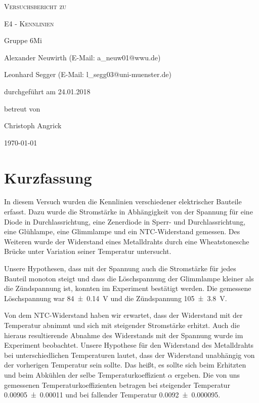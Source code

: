 \documentclass[
	a4paper,
	12pt,
	pagesize,
	ngerman
]{scrartcl}
\begin{document}
	
	\begin{titlepage}
		\centering
		{\scshape\LARGE Versuchsbericht zu \par}
		\vspace{1cm}
		{\scshape\huge E4 - Kennlinien \par} %
		\vspace{2.5cm}
		{\LARGE Gruppe 6Mi \par}
		\vspace{0.5cm}
		
		{\large Alexander Neuwirth (E-Mail: a\_neuw01@wwu.de) \par}
		{\large Leonhard Segger (E-Mail: l\_segg03@uni-muenster.de) \par}
		\vfill
		
		durchgeführt am 24.01.2018\par %
		betreut von\par
		{\large Christoph Angrick} %
		
		\vfill
		
		{\large \today\par}
	\end{titlepage}
	\tableofcontents
	\newpage


	\section{Kurzfassung}
	In diesem Versuch wurden die Kennlinien verschiedener elektrischer Bauteile erfasst.
	Dazu wurde die Stromstärke in Abhängigkeit von der Spannung für eine Diode in Durchlassrichtung, eine Zenerdiode in Sperr- und Durchlassrichtung, eine Glühlampe, eine Glimmlampe und ein NTC-Widerstand gemessen. 
	Des Weiteren wurde der Widerstand eines Metalldrahts durch eine Wheatstonesche Brücke unter Variation seiner Temperatur untersucht.

	Unsere Hypothesen, dass mit der Spannung auch die Stromstärke für jedes Bauteil monoton steigt und dass die Löschspannung der Glimmlampe kleiner als die Zündspannung ist, konnten im Experiment bestätigt werden.
	Die gemessene Löschspannung war \SI{84\pm 0,14}{V} und die Zündspannung \SI{105\pm3,8}{V}.

	Von dem NTC-Widerstand haben wir erwartet, dass der Widerstand mit der Temperatur abnimmt und sich mit steigender Stromstärke erhitzt. 
	Auch die hieraus resultierende Abnahme des Widerstands mit der Spannung wurde im Experiment beobachtet. %
	Unsere Hypothese für den Widerstand des Metalldrahts bei unterschiedlichen Temperaturen lautet, dass der Widerstand unabhängig von der vorherigen Temperatur sein sollte. 
	Das heißt, es sollte sich beim Erhitzten und beim Abkühlen der selbe Temperaturkoeffizient $\alpha$ ergeben.
	Die von uns gemessenen Temperaturkoeffizienten betragen bei steigender Temperatur \SI{0,00905\pm 0,00011}{} und bei fallender Temperatur \SI{0,0092\pm 0,000095}{}.
\end{document}
